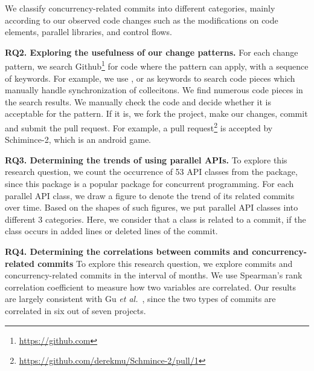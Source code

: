 We classify concurrency-related commits into different categories, mainly according to our observed code changes such as the modifications on code elements, parallel libraries, and control flows.

\textbf{RQ2. Exploring the usefulness of our change patterns.} For each change pattern, we search Github\footnote{\url{https://github.com}} for code where the pattern can apply, with a sequence of keywords. For example, we use ,  or  as keywords to search code pieces which manually handle synchronization of collecitons. We find numerous code pieces in the search results. We manually check the code and decide whether it is acceptable for the pattern. If it is, we fork the project, make our changes, commit and submit the pull request. For example, a pull request\footnote{\url{https://github.com/derekmu/Schmince-2/pull/1}} is accepted by Schimince-2, which is an android game.

\textbf{RQ3. Determining the trends of using parallel APIs.} To explore this research question, we count the occurrence of 53 API classes from the  package, since this package is a popular package for concurrent programming. For each parallel API class, we draw a figure to denote the trend of its related commits over time. Based on the shapes of such figures, we put parallel API classes into different 3 categories. Here, we consider that a class is related to a commit, if the class occurs in added lines or deleted lines of the commit.%

\textbf{RQ4. Determining the correlations between commits and concurrency-related commits} To explore this research question, we explore commits and concurrency-related commits in the interval of months. We use Spearman's rank correlation coefficient to measure how two variables are correlated. Our results are largely consistent with Gu \emph{et al.}~\cite{conf/sigsoft/GuJSZL15}, since the two types of commits are correlated in six out of seven projects.%




